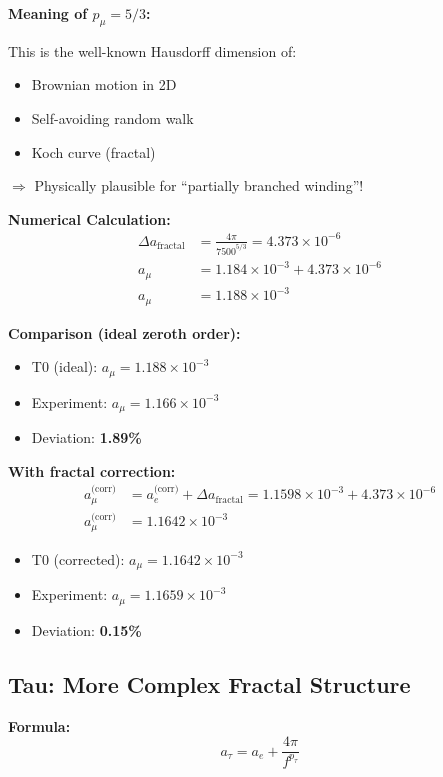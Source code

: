 	\textbf{Meaning of $p_\mu = 5/3$:}
	
	This is the well-known Hausdorff dimension of:
	\begin{itemize}
		\item Brownian motion in 2D
		\item Self-avoiding random walk
		\item Koch curve (fractal)
	\end{itemize}
	
	$\Rightarrow$ Physically plausible for ``partially branched winding''!
	
	\textbf{Numerical Calculation:}
	\begin{align}
		\Delta a_{\text{fractal}} &= \frac{4\pi}{7500^{5/3}} = 4.373 \times 10^{-6} \\
		a_\mu &= 1.184 \times 10^{-3} + 4.373 \times 10^{-6} \\
		a_\mu &= 1.188 \times 10^{-3}
	\end{align}
	
	\textbf{Comparison (ideal zeroth order):}
	\begin{itemize}
		\item T0 (ideal): $a_\mu = 1.188 \times 10^{-3}$
		\item Experiment: $a_\mu = 1.166 \times 10^{-3}$
		\item Deviation: \textbf{1.89\%}
	\end{itemize}
	
	\textbf{With fractal correction:}
	\begin{align}
		a_\mu^\text{(corr)} &= a_e^\text{(corr)} + \Delta a_\text{fractal} = 1.1598 \times 10^{-3} + 4.373 \times 10^{-6} \\
		a_\mu^\text{(corr)} &= 1.1642 \times 10^{-3}
	\end{align}
	\begin{itemize}
		\item T0 (corrected): $a_\mu = 1.1642 \times 10^{-3}$
		\item Experiment: $a_\mu = 1.1659 \times 10^{-3}$
		\item Deviation: \textbf{0.15\%}
	\end{itemize}
	
	\subsection{Tau: More Complex Fractal Structure}
	
	\textbf{Formula:}
	\begin{equation}
		a_\tau = a_e + \frac{4\pi}{f^{p_\tau}}
		\label{eq:atau}
	\end{equation}
	
